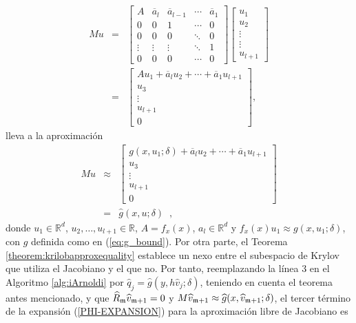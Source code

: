 \begin{eqnarray*}
	Mu & = & \left[ 
	\begin{array}{ccccc}
		A & \overline{a}_{l} & \overline{a}_{l-1} & \cdots  & \overline{a}_{1} \\ 
		0 & 0 & 1 & \cdots  & 0 \\ 
		0 & 0 & 0 & \ddots  & 0 \\ 
		\vdots  & \vdots  & \vdots  & \ddots  & 1 \\ 
		0 & 0 & 0 & \cdots  & 0
	\end{array}
	\right] \left[ 
	\begin{array}{c}
		u_{1} \\ 
		u_{2} \\ 
		\vdots  \\ 
		\vdots  \\ 
		u_{l+1}
	\end{array}
	\right]  \\
	& = & 	\left[ 
	\begin{array}{c}
		Au_{1}+\overline{a}_{l}u_{2}+\cdots +\overline{a}_{1}u_{l+1} \\ 
		u_{3} \\ 
		\vdots  \\ 
		u_{l+1} \\ 
		0
	\end{array}
	\right] ,
\end{eqnarray*}
lleva a la aproximación 
\begin{eqnarray*}
Mu	& \approx &  	\left[ 
	\begin{array}{c}
		g(x,u_1;\delta)+\overline{a}_{l}u_{2}+\cdots +\overline{a}_{1}u_{l+1} \\ 
		u_{3} \\ 
		\vdots  \\ 
		u_{l+1} \\ 
		0
	\end{array}
	\right] \\
	& = &
	\widehat{g}(x,u;\delta)\;\;,
\end{eqnarray*}
donde $u_1\in\mathbb{R}^{d}$, $u_2,\ldots,u_{l+1}\in\mathbb{R}$, $A=f_x(x)$, $a_l\in \mathbb{R}^d$ y $f_x(x)u_1\approx g(x,u_1;\delta)$, con $g$ definida como en (\ref{eq:g_bound}). Por otra parte, el Teorema \ref{theorem:krilobapproxequality} establece un nexo entre el subespacio de Krylov que utiliza el Jacobiano y el que no. Por tanto, reemplazando la línea 3  en el Algoritmo \ref{alg:iArnoldi}  por $\widehat{q}_j=\widehat{g}(y,h \widehat{v}_j;\delta)$, teniendo en cuenta el teorema antes mencionado, y que $\widehat{R}_{\mathfrak{m}} \widehat{v}_{\mathfrak{m}+1}=0$ y $M\widehat{v}_{\mathfrak{m}+1}\approx \widehat{g}(x,\widehat{v}_{\mathfrak{m}+1};\delta)$, el tercer término de la expansión (\ref{PHI-EXPANSION}) para la aproximación libre de Jacobiano es \cite{naranjo2023jacobian}

